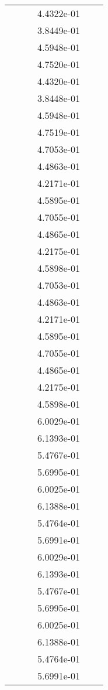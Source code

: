 \begin{xltabular}{\textwidth}{r|rS[table-format=1.3e+2]S[table-format=1.4e+2]S[table-format=1.4e+2]S[table-format=-1.5]}
&  &  & 4.4322e-01 & & \\
&  &  & 3.8449e-01 & & \\
&  &  & 4.5948e-01 & & \\
&  &  & 4.7520e-01 & & \\
&  &  & 4.4320e-01 & & \\
&  &  & 3.8448e-01 & & \\
&  &  & 4.5948e-01 & & \\
&  &  & 4.7519e-01 & & \\
&  &  & 4.7053e-01 & & \\
&  &  & 4.4863e-01 & & \\
&  &  & 4.2171e-01 & & \\
&  &  & 4.5895e-01 & & \\
&  &  & 4.7055e-01 & & \\
&  &  & 4.4865e-01 & & \\
&  &  & 4.2175e-01 & & \\
&  &  & 4.5898e-01 & & \\
&  &  & 4.7053e-01 & & \\
&  &  & 4.4863e-01 & & \\
&  &  & 4.2171e-01 & & \\
&  &  & 4.5895e-01 & & \\
&  &  & 4.7055e-01 & & \\
&  &  & 4.4865e-01 & & \\
&  &  & 4.2175e-01 & & \\
&  &  & 4.5898e-01 & & \\
&  &  & 6.0029e-01 & & \\
&  &  & 6.1393e-01 & & \\
&  &  & 5.4767e-01 & & \\
&  &  & 5.6995e-01 & & \\
&  &  & 6.0025e-01 & & \\
&  &  & 6.1388e-01 & & \\
&  &  & 5.4764e-01 & & \\
&  &  & 5.6991e-01 & & \\
&  &  & 6.0029e-01 & & \\
&  &  & 6.1393e-01 & & \\
&  &  & 5.4767e-01 & & \\
&  &  & 5.6995e-01 & & \\
&  &  & 6.0025e-01 & & \\
&  &  & 6.1388e-01 & & \\
&  &  & 5.4764e-01 & & \\
&  &  & 5.6991e-01 & & \\

\end{xltabular}
